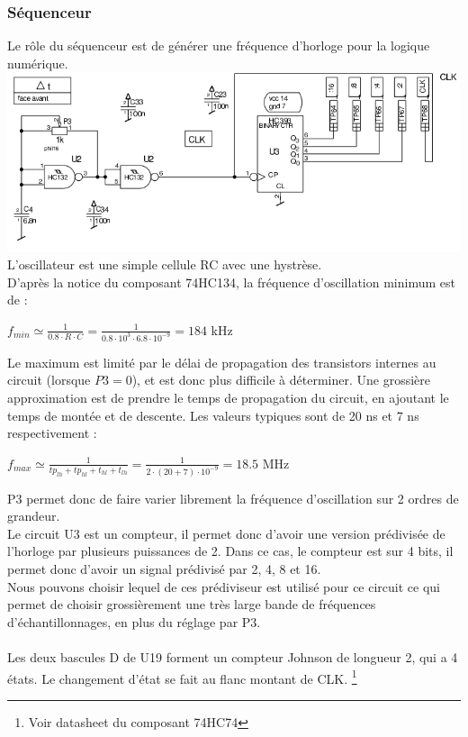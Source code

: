 \documentclass{article}
\begin{document}
\subsubsection{Séquenceur}
Le rôle du séquenceur est de générer une fréquence d'horloge pour la logique numérique.\\
\includegraphics[width = 1\linewidth]{shema_sequenceur_1.png}
L'oscillateur est une simple cellule RC avec une hystrèse.\\
D'après la notice du composant 74HC134, la fréquence d'oscillation minimum est de :
\begin{center}
$f_{min} \simeq \frac{1}{0.8 \cdot R \cdot C} = \frac{1}{0.8 \cdot 10^3 \cdot 6.8 \cdot 10^{-9}} = 184 $ kHz
\end{center}
Le maximum est limité par le délai de propagation des transistors internes au circuit (lorsque $P3 = 0$), et est donc plus difficile à déterminer. Une grossière approximation est de prendre le temps de propagation du circuit, en ajoutant le temps de montée et de descente. Les valeurs typiques sont de 20 ns et 7 ns respectivement :
\begin{center}
$f_{max} \simeq \frac{1}{tp_{lh} + tp_{hl} + t_{hl} + t_{lh}} = \frac{1}{2 \cdot (20+7) \cdot 10^{-9}} = 18.5 $ MHz
\end{center}
P3 permet donc de faire varier librement la fréquence d'oscillation sur 2 ordres de grandeur.
\\
Le circuit U3 est un compteur, il permet donc d'avoir une version prédivisée de l'horloge par plusieurs puissances de 2. Dans ce cas, le compteur est sur 4 bits, il permet donc d'avoir un signal prédivisé par 2, 4, 8 et 16.\\
Nous pouvons choisir lequel de ces prédiviseur est utilisé pour ce circuit ce qui permet de choisir grossièrement une très large bande de fréquences d'échantillonnages, en plus du réglage par P3.
\\\\
Les deux bascules D de U19 forment un compteur Johnson de longueur 2, qui a 4 états. Le changement d'état se fait au flanc montant de CLK. \footnote{Voir datasheet du composant 74HC74}\\
\end{document}
